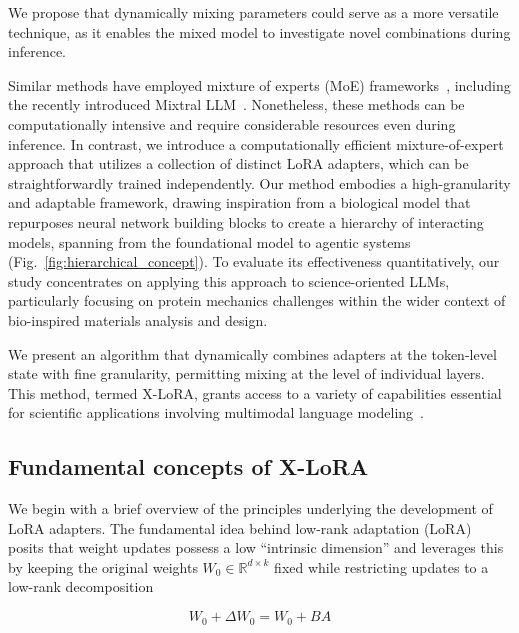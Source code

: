 We propose that dynamically mixing parameters could serve as a more versatile technique, as it enables the mixed model to investigate novel combinations during inference.

Similar methods have employed mixture of experts (MoE) frameworks~\cite{Jacobs1991AdaptiveExperts,Hampshire1992TheRecognition,Jordan1994HierarchicalAlgorithm}, including the recently introduced Mixtral LLM~\cite{Jiang2024MixtralExperts}. Nonetheless, these methods can be computationally intensive and require considerable resources even during inference. In contrast, we introduce a computationally efficient mixture-of-expert approach that utilizes a collection of distinct LoRA adapters, which can be straightforwardly trained independently. Our method embodies a high-granularity and adaptable framework, drawing inspiration from a biological model that repurposes neural network building blocks to create a hierarchy of interacting models, spanning from the foundational model to agentic systems (Fig.~\ref{fig:hierarchical_concept}). To evaluate its effectiveness quantitatively, our study concentrates on applying this approach to science-oriented LLMs, particularly focusing on protein mechanics challenges within the wider context of bio-inspired materials analysis and design.

We present an algorithm that dynamically combines adapters at the token-level state with fine granularity, permitting mixing at the level of individual layers. This method, termed X-LoRA, grants access to a variety of capabilities essential for scientific applications involving multimodal language modeling~\cite{Hu2023DeepScience,Buehler2023AMetamaterials,Buehler2022ProteinNetworks,}.

\subsection{Fundamental concepts of X-LoRA}

We begin with a brief overview of the principles underlying the development of LoRA adapters. The fundamental idea behind low-rank adaptation (LoRA)~\cite{hu2021lora} posits that weight updates possess a low “intrinsic dimension” and leverages this by keeping the original weights $W_0 \in \mathbb{R}^{d \times k}$ fixed while restricting updates to a low-rank decomposition

\begin{equation}
W_0 + \Delta W_0 = W_0 + BA 
\end{equation}

